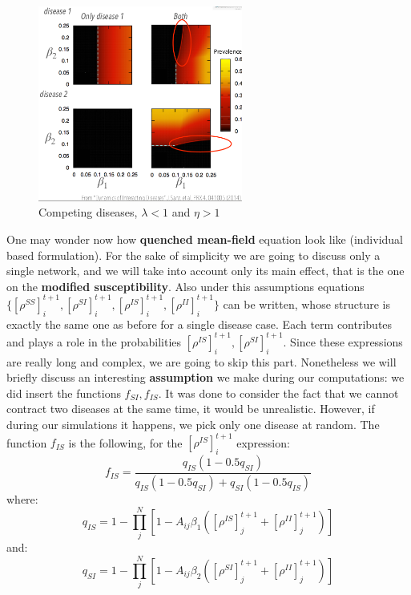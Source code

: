 \documentclass[../main/main.tex]{subfiles}
\begin{document}
\begin{figure}[h!]
\centering
\includegraphics[width=0.6\textwidth]{../lessons/image/11/image006.png}
\caption{\label{fig:11_006} Competing diseases, \( \lambda < 1 \) and \( \eta >1 \) }
\end{figure}

One may wonder now how \textbf{quenched mean-field} equation look like (individual based formulation). For the sake of simplicity we are going to discuss only a single network, and we will take into account only its main effect, that is the one on the \textbf{modified susceptibility}. Also under this assumptions equations $\{[\rho ^{SS}]^{t+1}_i, [\rho ^{SI}]^{t+1}_i, [\rho ^{IS}]^{t+1}_i, [\rho ^{II}]^{t+1}_i \}$ can be written, whose structure is exactly the same one as before for a single disease case. Each term contributes and plays a role in the probabilities \( [\rho ^{IS}]^{t+1}_i, [\rho ^{SI}]^{t+1}_i \). Since these expressions are really long and complex, we are going to skip this part. Nonetheless we will briefly discuss an interesting \textbf{assumption} we make during our computations: we did insert the functions \( f_{SI}, f_{IS} \). It was done to consider the fact that we cannot contract two diseases at the same time, it would be unrealistic. However, if during our simulations it happens, we pick only one disease at random. The function $f_{IS}$ is the following, for the \( [\rho ^{IS}]^{t+1}_i \) expression:
\begin{equation}
    f_{IS} = \frac{q_{IS} (1-0.5 q_{SI})}{q_{IS} (1-0.5 q_{SI}) + q_{SI} (1-0.5 q_{IS})}
\end{equation}
where:
\begin{equation}
    q_{IS} = 1 - \prod_j^N \left[ 1-A_{ij} \beta_1 \left( [\rho ^{IS}]^{t+1}_j + [\rho ^{II}]^{t+1}_j \right) \right]
\end{equation}
and:
\begin{equation}
    q_{SI} = 1 - \prod_j^N \left[ 1-A_{ij} \beta_2 \left( [\rho ^{SI}]^{t+1}_j + [\rho ^{II}]^{t+1}_j \right) \right]
\end{equation}
\end{document}
